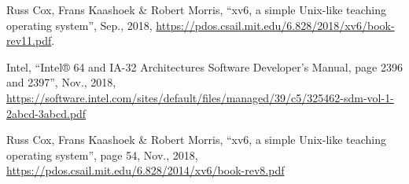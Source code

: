 \documentclass[10pt,a4j]{jarticle}
\begin{document}

\begin{thebibliography}{10}


Russ Cox, Frans Kaashoek \& Robert Morris,
``xv6, a simple Unix-like teaching operating system'', Sep., 2018,
\url{https://pdos.csail.mit.edu/6.828/2018/xv6/book-rev11.pdf}.

Intel,
``Intel® 64 and IA-32 Architectures Software Developer's Manual, page 2396 and 2397'', Nov., 2018,
\url{https://software.intel.com/sites/default/files/managed/39/c5/325462-sdm-vol-1-2abcd-3abcd.pdf}

Russ Cox, Frans Kaashoek \& Robert Morris,
``xv6, a simple Unix-like teaching operating system'', page 54, Nov., 2018,
\url{https://pdos.csail.mit.edu/6.828/2014/xv6/book-rev8.pdf}

\end{thebibliography}
\end{document}
